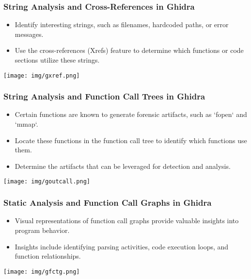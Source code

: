 \begin{frame}
\frametitle{String Analysis and Cross-References in Ghidra}

\begin{itemize}
    \item Identify interesting strings, such as filenames, hardcoded paths, or error messages.
    \item Use the cross-references (Xrefs) feature to determine which functions or code sections utilize these strings.
\end{itemize}

\centering
\texttt{[image: img/gxref.png]}
\end{frame}


\begin{frame}
\frametitle{String Analysis and Function Call Trees in Ghidra}

\begin{itemize}
    \item Certain functions are known to generate forensic artifacts, such as `fopen` and `mmap`.
    \item Locate these functions in the function call tree to identify which functions use them.
    \item Determine the artifacts that can be leveraged for detection and analysis.
\end{itemize}

\centering
\texttt{[image: img/goutcall.png]}
\end{frame}


\begin{frame}
\frametitle{Static Analysis and Function Call Graphs in Ghidra}

\begin{itemize}
    \item Visual representations of function call graphs provide valuable insights into program behavior.
    \item Insights include identifying parsing activities, code execution loops, and function relationships.
\end{itemize}

\centering
\texttt{[image: img/gfctg.png]}
\end{frame}
